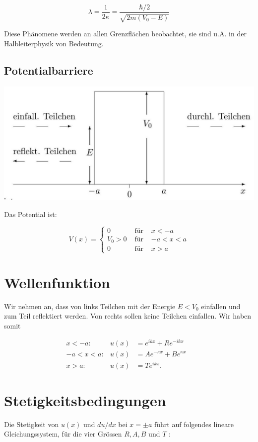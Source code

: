 \documentclass[10pt, letterpaper]{article}
\begin{document}
$$
\lambda=\frac{1}{2 \kappa}=\frac{\hbar / 2}{\sqrt{2 m\left(V_{0}-E\right)}}
$$

Diese Phänomene werden an allen Grenzflächen beobachtet, sie sind u.A. in der Halbleiterphysik von Bedeutung.

\subsection*{Potentialbarriere}
\begin{center}
\includegraphics[scale=0.2]{2025_05_21_2790b5a0182e53887e3bg-08}
\end{center}

Das Potential ist:

$$
V(x)=\left\{\begin{array}{llc}
0 & \text { für } & x<-a \\
V_{0}>0 & \text { für } & -a<x<a \\
0 & \text { für } & x>a
\end{array}\right.
$$

\section*{Wellenfunktion}
Wir nehmen an, dass von links Teilchen mit der Energie $E<V_{0}$ einfallen und zum Teil reflektiert werden. Von rechts sollen keine Teilchen einfallen. Wir haben somit

$$
\begin{aligned}
x<-a: & u(x) & =e^{i k x}+R e^{-i k x} & \\
-a<x<a: & u(x) & =A e^{-\kappa x}+B e^{\kappa x} & \\
x>a: & u(x) & =T e^{i k x} . &
\end{aligned}
$$

\section*{Stetigkeitsbedingungen}
Die Stetigkeit von $u(x)$ und $d u / d x$ bei $x= \pm a$ führt auf folgendes lineare Gleichungssystem, für die vier Grössen $R, A, B$ und $T$ :
\end{document}
